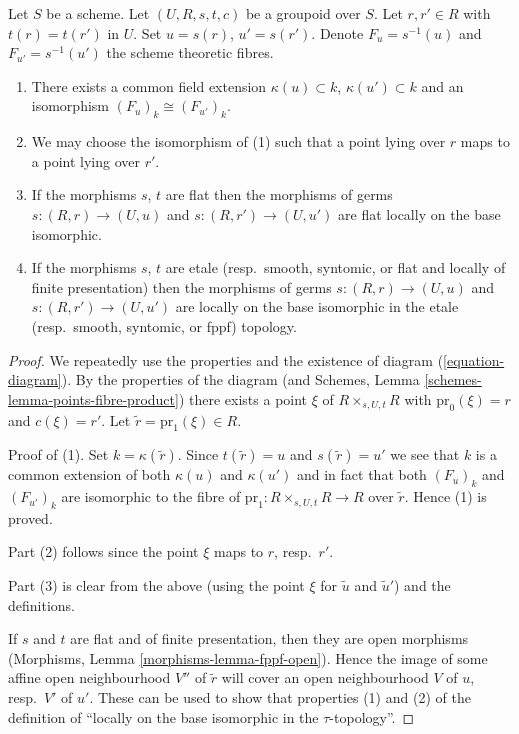 \begin{lemma}
\label{lemma-two-fibres}
Let $S$ be a scheme.
Let $(U, R, s, t, c)$ be a groupoid over $S$.
Let $r, r' \in R$ with $t(r) = t(r')$ in $U$.
Set $u = s(r)$, $u' = s(r')$.
Denote $F_u = s^{-1}(u)$ and $F_{u'} = s^{-1}(u')$ the scheme
theoretic fibres.
\begin{enumerate}
\item There exists a common field extension
$\kappa(u) \subset k$, $\kappa(u') \subset k$ and
an isomorphism $(F_u)_k \cong (F_{u'})_k$.
\item We may choose the isomorphism of (1) such that a point
lying over $r$ maps to a point lying over $r'$.
\item If the morphisms $s$, $t$ are flat then the morphisms of germs
$s : (R, r) \to (U, u)$ and $s : (R, r') \to (U, u')$ are flat
locally on the base isomorphic.
\item If the morphisms $s$, $t$ are etale
(resp.\ smooth, syntomic, or flat and locally of finite presentation)
then the morphisms of germs $s : (R, r) \to (U, u)$ and
$s : (R, r') \to (U, u')$ are locally on the base isomorphic
in the etale (resp.\ smooth, syntomic, or fppf) topology.
\end{enumerate}
\end{lemma}

\begin{proof}
We repeatedly use the properties and the existence of
diagram (\ref{equation-diagram}).
By the properties of the diagram (and
Schemes, Lemma \ref{schemes-lemma-points-fibre-product})
there exists a point $\xi$ of $R \times_{s, U, t} R$
with $\text{pr}_0(\xi) = r$ and $c(\xi) = r'$.
Let $\tilde r = \text{pr}_1(\xi) \in R$.

\medskip\noindent
Proof of (1). Set $k = \kappa(\tilde r)$. Since $t(\tilde r) = u$
and $s(\tilde r) = u'$ we see that $k$ is a common extension
of both $\kappa(u)$ and $\kappa(u')$ and in fact that
both $(F_u)_k$ and $(F_{u'})_k$ are isomorphic to the fibre of
$\text{pr}_1 : R \times_{s, U, t} R \to R$ over $\tilde r$.
Hence (1) is proved.

\medskip\noindent
Part (2) follows since the point $\xi$ maps to $r$, resp.\ $r'$.

\medskip\noindent
Part (3) is clear from the above (using the point $\xi$ for
$\tilde u$ and $\tilde u'$) and the definitions.

\medskip\noindent
If $s$ and $t$ are flat and of finite presentation, then
they are open morphisms (Morphisms, Lemma \ref{morphisms-lemma-fppf-open}).
Hence the image of some affine open neighbourhood $V''$ of $\tilde r$ will
cover an open neighbourhood $V$ of $u$, resp.\ $V'$ of $u'$.
These can be used to show that properties (1) and (2) of the
definition of ``locally on the base isomorphic in the
$\tau$-topology''.
\end{proof}







